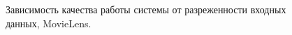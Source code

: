 \documentclass[a4paper, 12pt]{article} %
\begin{document}
	\begin{figure}[h!]
	\begin{minipage}[h]{0.49\linewidth}
	\end{minipage}
	\hfill
	\begin{minipage}[h]{0.49\linewidth}
	\end{minipage}
	\caption{Зависимость качества работы системы от разреженности входных данных, MovieLens.}
	\label{fig:movielens_accuracy}
	\end{figure}
	
\end{document}
